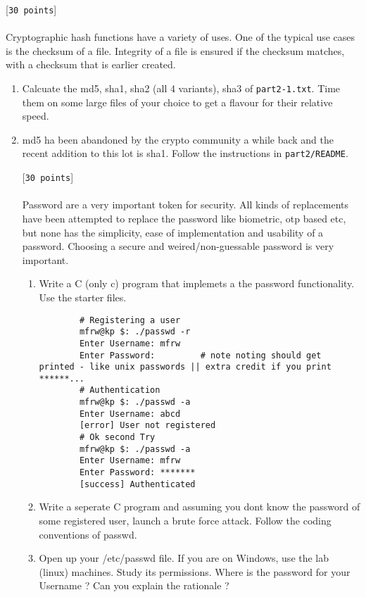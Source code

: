 \documentclass[11pt]{article}
\begin{document}
 [\texttt{30 points}] \\\\
Cryptographic hash functions have a variety of uses. One of the typical use cases is the checksum of a file. Integrity of a file is ensured if the checksum matches, with a checksum that is earlier created.
\begin{enumerate}
	\item Calcuate the md5, sha1, sha2 (all 4 variants), sha3 of \texttt{part2-1.txt}. Time them on some large files of your choice to get a flavour for their relative speed.
	\item md5 ha been abandoned by the crypto community a while back and the recent addition to this lot is sha1. Follow the instructions in \texttt{part2/README}.

\newpage
{} [\texttt{30 points}] \\\\
Password are a very important token for security. All kinds of replacements have been attempted to replace the password like biometric, otp based etc, but none has the
simplicity, ease of implementation and usability of a password. Choosing a secure and weired/non-guessable password is very important.

\begin{enumerate}
	\item { 
		Write a C (only c) program that implemets a the password functionality. Use the starter files.
		\begin{verbatim}
		# Registering a user
		mfrw@kp $: ./passwd -r
		Enter Username: mfrw
		Enter Password:         # note noting should get printed - like unix passwords || extra credit if you print ******...
		# Authentication
		mfrw@kp $: ./passwd -a
		Enter Username: abcd
		[error] User not registered
		# Ok second Try
		mfrw@kp $: ./passwd -a
		Enter Username: mfrw
		Enter Password: *******
		[success] Authenticated
		\end{verbatim}
		}



	\item Write a seperate C program and assuming you dont know the password of some registered user, launch a brute force attack. Follow the coding conventions of passwd.

	\item Open up your /etc/passwd file. If you are on Windows, use the lab (linux) machines. Study its permissions. Where is the password for your Username ? Can you explain the rationale ?
	

\end{enumerate}
\end{enumerate}
\end{document}
